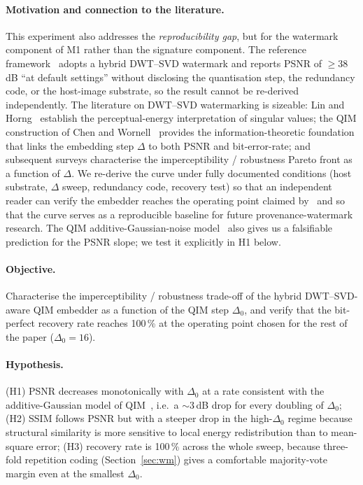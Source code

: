 \documentclass[11pt,a4paper]{article}
\theoremstyle{definition}
\theoremstyle{plain}
\theoremstyle{remark}
\begin{document}
\paragraph{Motivation and connection to the literature.}
This experiment also addresses the \emph{reproducibility gap}, but
for the watermark component of M1 rather than the signature
component. The reference framework~\cite{bib4} adopts a hybrid
DWT--SVD watermark and reports PSNR of $\geq 38$\,dB ``at default
settings'' without disclosing the quantisation step, the
redundancy code, or the host-image substrate, so the result cannot
be re-derived independently. The literature on DWT--SVD
watermarking is sizeable: Lin and Horng~\cite{bib37} establish
the perceptual-energy interpretation of singular values; the QIM
construction of Chen and Wornell~\cite{bib39} provides the
information-theoretic foundation that links the embedding step
$\Delta$ to both PSNR and bit-error-rate; and subsequent surveys
characterise the imperceptibility / robustness Pareto front as a
function of $\Delta$. We re-derive the curve under fully
documented conditions (host substrate, $\Delta$ sweep, redundancy
code, recovery test) so that an independent reader can verify the
embedder reaches the operating point claimed by~\cite{bib4} and so
that the curve serves as a reproducible baseline for future
provenance-watermark research. The QIM additive-Gaussian-noise
model~\cite{bib39} also gives us a falsifiable prediction for the
PSNR slope; we test it explicitly in H1 below.

\paragraph{Objective.}
Characterise the imperceptibility / robustness trade-off of the hybrid
DWT--SVD-aware QIM embedder as a function of the QIM step
$\Delta_0$, and verify that the bit-perfect recovery rate reaches
100\,\% at the operating point chosen for the rest of the paper
($\Delta_0\!=\!16$).

\paragraph{Hypothesis.}
(H1) PSNR decreases monotonically with $\Delta_0$ at a rate consistent
with the additive-Gaussian model of QIM~\cite{bib39}, i.e.\ a
$\sim$3\,dB drop for every doubling of $\Delta_0$;
(H2) SSIM follows PSNR but with a steeper drop in the high-$\Delta_0$
regime because structural similarity is more sensitive to local
energy redistribution than to mean-square error;
(H3) recovery rate is 100\,\% across the whole sweep, because three-fold
repetition coding (Section~\ref{sec:wm}) gives a comfortable
majority-vote margin even at the smallest $\Delta_0$.
\end{document}
